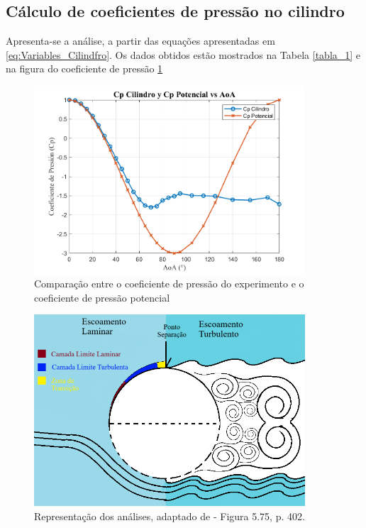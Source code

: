 \subsection{Cálculo de coeficientes de pressão no cilindro}
Apresenta-se a análise, a partir das equações apresentadas em \eqref{eq:Variables_Cilindfro}. Os dados obtidos estão mostrados na Tabela \ref{tabla_1} e na figura do coeficiente de pressão \ref{fig:Cp}

\begin{figure}[htbp]
    \centering
    \includegraphics[width=0.9\textwidth]{01.Parte1/Figuras/Cilindro_Cp.png}
    \caption{Comparação entre o coeficiente de pressão do
experimento e o coeficiente de pressão potencial}
    \label{fig:Cp}
\end{figure}


\begin{figure}[htbp]
    \centering
    \includegraphics[width=0.9\textwidth]{01.Parte1/Figuras/Clindrof.png}
    \caption{Representação dos análises, adaptado de \cite{anderson2016introduction} - Figura 5.75, p. 402.}
    \label{fig:CilindroAnderson}
\end{figure}


